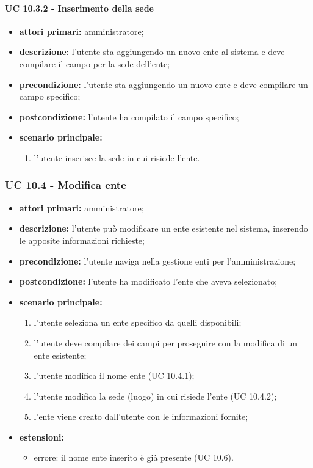 				\paragraph{UC 10.3.2 - Inserimento della sede}
				\begin{itemize}
					\item \textbf{attori primari:} amministratore;
					\item \textbf{descrizione:} l'utente sta aggiungendo un nuovo ente al sistema e deve compilare il campo per la sede dell'ente;
					\item \textbf{precondizione:} l'utente sta aggiungendo un nuovo ente e deve compilare un campo specifico;
					\item \textbf{postcondizione:} l'utente ha compilato il campo specifico;
					\item \textbf{scenario principale:}
					\begin{enumerate}
						\item l'utente inserisce la sede in cui risiede l'ente.
					\end{enumerate}
				\end{itemize}

			\subsubsection{UC 10.4 - Modifica ente}
			\begin{itemize}
				\item \textbf{attori primari:} amministratore;
				\item \textbf{descrizione:} l'utente può modificare un ente esistente nel sistema, inserendo le apposite informazioni richieste;
				\item \textbf{precondizione:} l'utente naviga nella gestione enti per l'amministrazione;
				\item \textbf{postcondizione:} l'utente ha modificato l'ente che aveva selezionato;
				\item \textbf{scenario principale:}
				\begin{enumerate}
					\item l'utente seleziona un ente specifico da quelli disponibili;
					\item{l'utente deve compilare dei campi per proseguire con la modifica di un ente esistente;}
					\item l'utente modifica il nome ente (UC 10.4.1);
					\item l'utente modifica la sede (luogo) in cui risiede l'ente (UC 10.4.2);
					\item{l'ente viene creato dall'utente con le informazioni fornite;}
				\end{enumerate}
				\item \textbf{estensioni:}
					\begin{itemize}
						\item errore: il nome ente inserito è già presente (UC 10.6).
					\end{itemize}
			\end{itemize}

